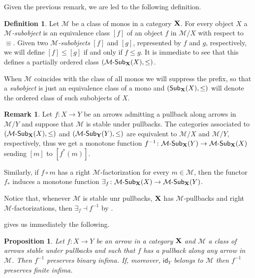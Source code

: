 \documentclass[a4paper]{article}
\newcommand{\sub}[3]{{\mathcal{#1}}\textrm{-}\mathsf{Sub}_{\textbf {\textup{#2}}}(#3)}
\newcommand{\msub}[2]{\mathsf{Sub}_{\textbf {\textup{#1}}}(#2)}
\newcommand{\id}[1]{\mathsf{id}_{#1}}
\def\X{\textbf {\textup{X}}}
\newtheorem{proposition}[theorem]{Proposition}
\theoremstyle{definition}
\newtheorem{definition}[theorem]{Definition}
\newtheorem{remark}[theorem]{Remark}
\begin{document}
Given the previous remark, we are led to the following definition.

\begin{definition} Let $\mathcal{M}$ be a class of monos in a category $\X$. For every object $X$ a \emph{$\mathcal{M}$-subobject} is an equivalence class $[f]$ of an object $f$ in $\mathcal{M}/X$ with respect to $\equiv$. Given two \emph{$\mathcal{M}$-subobjects} $[f]$ and $[g]$, represented by $f$ and $g$, respectively, we will define $[f]\leq [g]$ if and only if $f\leq g$. It is immediate to see that this defines a partially ordered class $(\sub{M}{X}{X}, \leq)$. 
	
	When $\mathcal{M}$ coincides with the class of all monos we will suppress the prefix, so that a \emph{subobject} is just an equivalence class of a mono and $(\msub{X}{X}, \leq)$ will denote the ordered class of such subobjects of $X$.
\end{definition}

\begin{remark}\label{rem:pbo} Let $f\colon X\to Y$ be an arrows admitting a pullback along arrows in $\mathcal{M}/Y$ and suppose that $\mathcal{M}$ is stable under pullbacks. The categories associated to $(\sub{M}{X}{X}, \leq)$ and $(\sub{M}{Y}{Y}, \leq)$ are equivalent to $\mathcal{M}/X$ and $\mathcal{M}/Y$, respectively, thus we get a monotone function $f^{-1}\colon \sub{M}{X}{Y}\to \sub{M}{X}{X}$ sending $[m]$ to $[f^*(m)]$.
	
	Similarly, if $f\circ m$ has a right $\mathcal{M}$-factorization for every $m\in \mathcal{M}$, then the functor $f_*$ induces a monotone function $\exists_f\colon \sub{M}{X}{X}\to \sub{M}{X}{Y}$.
	
	Notice that, whenever $\mathcal{M}$ is stable unr pullbacks, $\X$ has $\mathcal{M}$-pullbacks and  right $\mathcal{M}$-factorizations, then $\exists_f \dashv f^{-1}$ by .
\end{remark}

 gives us immediately the following.

\begin{proposition}\label{prop:finlim}
	Let $f\colon X\to Y$ be an arrow in a category $\X$ and $\mathcal{M}$ a class of arrows stable under pullbacks and such that $f$ has a pullback along any arrow in $\mathcal{M}$. Then $f^{-1}$ preserves binary infima. If, moreover, $\id{Y}$ belongs to $\mathcal{M}$ then $f^{-1}$ preserves finite infima.
\end{proposition}
\end{document}
